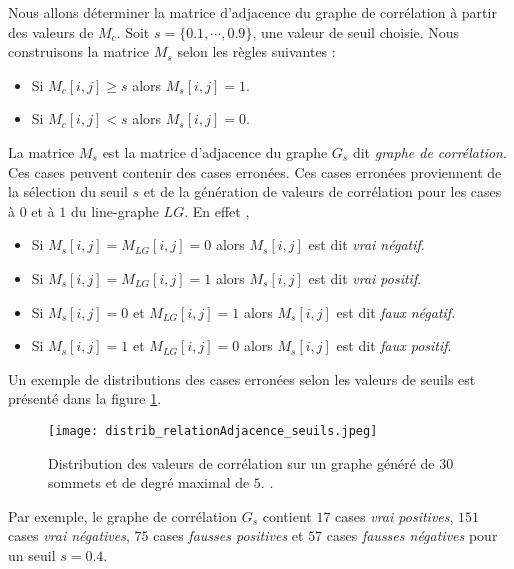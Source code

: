 Nous allons d\'eterminer la matrice d'adjacence du graphe de corr\'elation \`a partir des valeurs de $M_c$.
\newline 
Soit $s = \{ 0.1, \cdots, 0.9\}$, une valeur de seuil choisie.
Nous construisons la matrice $M_s$  selon les r\`egles suivantes : 
\begin{itemize}
\item Si $M_c[i,j] \ge s$ alors $M_s[i,j] = 1$.
\item Si $M_c[i,j] < s$ alors $M_s[i,j] = 0$.
\end{itemize}
La matrice $M_s$ est la matrice d'adjacence du graphe $G_s$  dit {\em graphe de corr\'elation}. Ces cases peuvent contenir des cases erron\'ees. Ces cases erron\'ees proviennent de la s\'election du seuil $s$ et de la g\'en\'eration de valeurs de corr\'elation pour les cases \`a $0$ et \`a $1$ du line-graphe $LG$. En effet ,
\begin{itemize}
	\item Si $M_s [i,j] = M_{LG} [i,j] = 0$ alors $M_{s} [i,j]$ est dit {\em vrai n\'egatif}. 
	\item Si $M_s [i,j] = M_{LG} [i,j] = 1$ alors $M_{s} [i,j]$ est dit {\em vrai positif}. 
	\item Si $M_s [i,j] = 0$ et $M_{LG} [i,j] = 1$ alors $M_{s} [i,j]$ est dit {\em faux n\'egatif}.
	\item Si $M_s [i,j] = 1$ et $M_{LG} [i,j] = 0$ alors $M_{s} [i,j]$ est dit {\em faux positif}.
\end{itemize}
Un exemple de distributions des cases erron\'ees selon les valeurs de seuils est pr\'esent\'e dans la figure \ref{distrib_relationAdjacence_seuils}. 
\begin{figure}[htb!] 
\centering
\texttt{[image: distrib\_relationAdjacence\_seuils.jpeg]}
\caption{ Distribution des valeurs de corr\'elation sur un graphe g\'en\'er\'e de $30$ sommets et de degr\'e maximal de $5$.
.}
\label{distrib_relationAdjacence_seuils} 
\end{figure}
Par exemple,  le graphe de corr\'elation $G_s$ contient 
$17$ cases {\em vrai positives}, 
$151$ cases {\em vrai n\'egatives}, 
$75$ cases {\em fausses positives} et 
$57$ cases {\em fausses n\'egatives} pour un seuil $s=0.4$.
